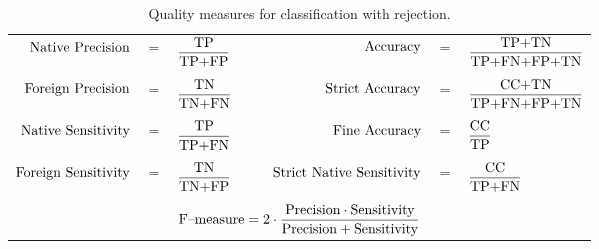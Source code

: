 \documentclass{llncs}
\begin{document}
\begin{table}[!h]
\vspace{-6pt}
\centering
\caption{Quality measures for classification with rejection.}
\vspace{-6pt}
{\footnotesize
\begin{tabular}{rclrcl}
  $\textnormal{Native Precision}$ &$=$& $\displaystyle\frac{\textnormal{TP}}{\textnormal{TP+FP}}$ & 
  $\textnormal{Accuracy}$ &$=$& $\displaystyle\frac{\textnormal{TP+TN}}{\textnormal{TP+FN+FP+TN}}$ \\
  &&&&&\vspace{-3pt}\\
  $\textnormal{Foreign Precision}$ &$=$& $\displaystyle\frac{\textnormal{TN}}{\textnormal{TN+FN}}$ &
  $\textnormal{Strict Accuracy}$ &$=$& $\displaystyle\frac{\textnormal{CC+TN}}{\textnormal{TP+FN+FP+TN}}$ \\
  &&&&&\vspace{-3pt}\\
  $\textnormal{Native Sensitivity}$ &$=$& $\displaystyle\frac{\textnormal{TP}}{\textnormal{TP+FN}}$ &
  $\textnormal{Fine Accuracy}$ &$=$& $\displaystyle\frac{\textnormal{CC}}{\textnormal{TP}}$ \\
  &&&&&\vspace{-3pt}\\
  $\textnormal{Foreign Sensitivity}$ &$=$& $\displaystyle\frac{\textnormal{TN}}{\textnormal{TN+FP}}$ &
  $\hspace{18pt}\textnormal{Strict Native Sensitivity}$ &$=$& $\displaystyle\frac{\textnormal{CC}}{\textnormal{TP+FN}}$\\
  &&&&&\vspace{-3pt}\\
  \multicolumn{6}{c}{$\textnormal{F--measure}=2\cdot\displaystyle\frac{\textnormal{Precision}\cdot\textnormal{Sensitivity}}{\textnormal{Precision}+\textnormal{Sensitivity}}$}
\end{tabular}
}
\label{tab:measures}
\vspace{-12pt}
\end{table}
\end{document}
